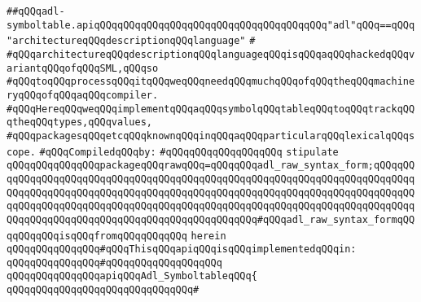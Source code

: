 \label{src/lib/compiler/back/low/tools/arch/adl-symboltable.api}
\verb|##qQQqadl-symboltable.apiqQQqqQQqqQQqqQQqqQQqqQQqqQQqqQQqqQQqqQQq"adl"qQQq==qQQq"architectureqQQqdescriptionqQQqlanguage"|\newline
\verb|#|\newline
\verb|#qQQqarchitectureqQQqdescriptionqQQqlanguageqQQqisqQQqaqQQqhackedqQQqvariantqQQqofqQQqSML,qQQqso|\newline
\verb|#qQQqtoqQQqprocessqQQqitqQQqweqQQqneedqQQqmuchqQQqofqQQqtheqQQqmachineryqQQqofqQQqaqQQqcompiler.|\newline
\verb|#qQQqHereqQQqweqQQqimplementqQQqaqQQqsymbolqQQqtableqQQqtoqQQqtrackqQQqtheqQQqtypes,qQQqvalues,|\newline
\verb|#qQQqpackagesqQQqetcqQQqknownqQQqinqQQqaqQQqparticularqQQqlexicalqQQqscope.|\newline
\newline
\verb|#qQQqCompiledqQQqby:|\newline
\verb|#qQQqqQQqqQQqqQQqqQQq|\newline
\newline
\verb|stipulate|\newline
\verb|qQQqqQQqqQQqqQQqpackageqQQqrawqQQq=qQQqqQQqadl_raw_syntax_form;qQQqqQQqqQQqqQQqqQQqqQQqqQQqqQQqqQQqqQQqqQQqqQQqqQQqqQQqqQQqqQQqqQQqqQQqqQQqqQQqqQQqqQQqqQQqqQQqqQQqqQQqqQQqqQQqqQQqqQQqqQQqqQQqqQQqqQQqqQQqqQQqqQQqqQQqqQQqqQQqqQQqqQQqqQQqqQQqqQQqqQQqqQQqqQQqqQQqqQQqqQQqqQQqqQQqqQQqqQQqqQQqqQQqqQQqqQQqqQQqqQQqqQQqqQQqqQQqqQQq#qQQqadl_raw_syntax_formqQQqqQQqqQQqisqQQqfromqQQqqQQqqQQq|\newline
\verb|herein|\newline
\newline
\verb|qQQqqQQqqQQqqQQq#qQQqThisqQQqapiqQQqisqQQqimplementedqQQqin:|\newline
\verb|qQQqqQQqqQQqqQQq#qQQqqQQqqQQqqQQqqQQq|\newline
\newline
\verb|qQQqqQQqqQQqqQQqapiqQQqAdl_SymboltableqQQq{|\newline
\verb|qQQqqQQqqQQqqQQqqQQqqQQqqQQqqQQq#|\newline
